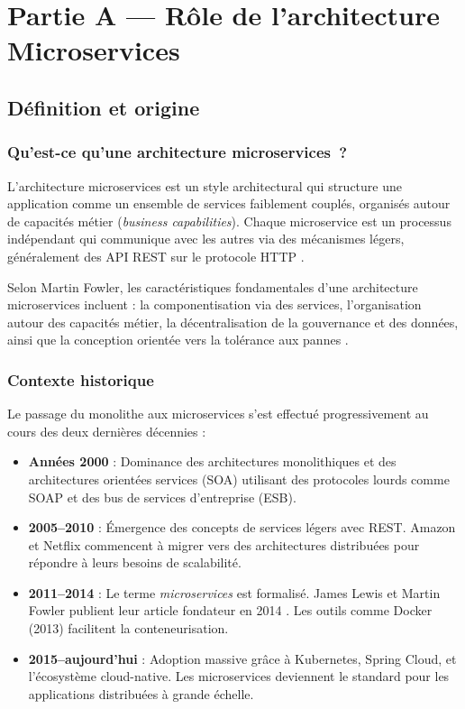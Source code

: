 \documentclass[12pt,a4paper]{article}
\begin{document}
\section{Partie A --- Rôle de l'architecture Microservices}
\label{sec:partieA}

\subsection{Définition et origine}

\subsubsection{Qu'est-ce qu'une architecture microservices~?}

L'architecture microservices est un style architectural qui structure une application comme un ensemble de services faiblement couplés, organisés autour de capacités métier (\textit{business capabilities}). Chaque microservice est un processus indépendant qui communique avec les autres via des mécanismes légers, généralement des API REST sur le protocole HTTP \cite{fowler2014}.

Selon Martin Fowler, les caractéristiques fondamentales d'une architecture microservices incluent : la componentisation via des services, l'organisation autour des capacités métier, la décentralisation de la gouvernance et des données, ainsi que la conception orientée vers la tolérance aux pannes \cite{fowler2014}.

\subsubsection{Contexte historique}

Le passage du monolithe aux microservices s'est effectué progressivement au cours des deux dernières décennies :

\begin{itemize}
    \item \textbf{Années 2000} : Dominance des architectures monolithiques et des architectures orientées services (SOA) utilisant des protocoles lourds comme SOAP et des bus de services d'entreprise (ESB).
    \item \textbf{2005--2010} : Émergence des concepts de services légers avec REST. Amazon et Netflix commencent à migrer vers des architectures distribuées pour répondre à leurs besoins de scalabilité.
    \item \textbf{2011--2014} : Le terme \textit{microservices} est formalisé. James Lewis et Martin Fowler publient leur article fondateur en 2014 \cite{fowler2014}. Les outils comme Docker (2013) facilitent la conteneurisation.
    \item \textbf{2015--aujourd'hui} : Adoption massive grâce à Kubernetes, Spring Cloud, et l'écosystème cloud-native. Les microservices deviennent le standard pour les applications distribuées à grande échelle.
\end{itemize}
\end{document}
